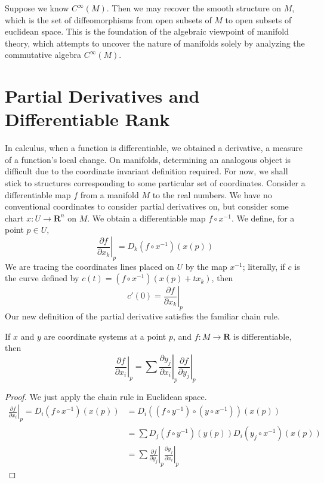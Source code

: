 Suppose we know $C^\infty(M)$. Then we may recover the smooth structure on $M$, which is the set of diffeomorphisms from open subsets of $M$ to open subsets of euclidean space. This is the foundation of the algebraic viewpoint of manifold theory, which attempts to uncover the nature of manifolds solely by analyzing the commutative algebra $C^\infty(M)$.



\section{Partial Derivatives and Differentiable Rank}

In calculus, when a function is differentiable, we obtained a derivative, a measure of a function's local change. On manifolds, determining an analogous object is difficult due to the coordinate invariant definition required. For now, we shall stick to structures corresponding to some particular set of coordinates. Consider a differentiable map $f$ from a manifold $M$ to the real numbers. We have no conventional coordinates to consider partial derivatives on, but consider some chart $x:U \to \mathbf{R}^n$ on $M$. We obtain a differentiable map $f \circ x^{-1}$. We define, for a point $p \in U$,
%
\[ \left. \frac{\partial f}{\partial x_k} \right|_p = D_k(f \circ x^{-1})(x(p)) \]
%
We are tracing the coordinates lines placed on $U$ by the map $x^{-1}$; literally, if $c$ is the curve defined by $c(t) = (f \circ x^{-1})(x(p) + tx_k)$, then
%
\[ c'(0) = \left.\frac{\partial f}{\partial x_k}\right|_p \]
%
Our new definition of the partial derivative satisfies the familiar chain rule.

\begin{theorem}
    If $x$ and $y$ are coordinate systems at a point $p$, and $f:M \to \mathbf{R}$ is differentiable, then
    \[ \left. \frac{\partial f}{\partial x_i} \right|_p = \sum \left. \frac{\partial y_j}{\partial x_i} \right|_p \left. \frac{\partial f}{\partial y_j} \right|_p \]
\end{theorem}
\begin{proof}
    We just apply the chain rule in Euclidean space.
    \begin{align*}
        \left.\frac{\partial f}{\partial x_i}\right|_p = D_i(f \circ x^{-1})(x(p)) &= D_i((f \circ y^{-1}) \circ (y \circ x^{-1}))(x(p))\\
        &= \sum D_j(f \circ y^{-1})(y(p)) D_i(y_j \circ x^{-1})(x(p))\\
        &= \sum \left.\frac{\partial f}{\partial y_j}\right|_p \left.\frac{\partial y_j}{\partial x_i}\right|_p
    \end{align*}
\end{proof}

